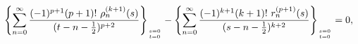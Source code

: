 \begin{equation}
\left\{
\sum_{n=0}^\infty
\frac{(-1)^{p+1}(p+1)!\ \rho_n^{(k+1)}(s)}{(t-n-\frac{1}{2})^{p+2}}
\right\}_{{s=0} \atop {t=0}}-
\left\{
\sum_{n=0}^\infty
\frac{(-1)^{k+1}(k+1)!\ r_n^{(p+1)}(s)}{(s-n-\frac{1}{2})^{k+2}}
\right\}_{{s=0} \atop {t=0}} = 0,
\label{41}
\end{equation}


